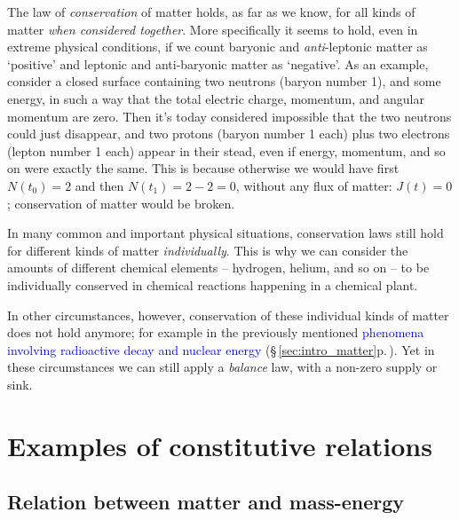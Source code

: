 \documentclass[a4paper,12pt,%
onecolumn,oneside,%
british%
]{memoir}
\renewcommand*{\|}[1][]{\nonscript\:#1\vert\nonscript\:\mathopen{}}
\newcommand*{\sect}{\S}%
\renewcommand*{\autoref}[3][\sect\,\ref]{\textcolor{blue}{#3} {\color{blue}\scriptsize(\faIcon[regular]{eye}\;#1{#2}\;p.\,\pageref{#2})}}
\newcommand*{\masse}{mass-energy}
\newcommand*{\yti}{t_{0}}
\newcommand*{\ytf}{t_{1}}
\newcommand*{\yN}{N}
\newcommand*{\yJ}{J}
\begin{document}
The law of \emph{conservation} of matter holds, as far as we know, for all kinds of matter \emph{when considered together}.
More specifically it seems to hold, even in extreme physical conditions, if we count baryonic and \emph{anti}-leptonic matter as \enquote*{positive} and leptonic and anti-baryonic matter as \enquote*{negative}. As an example, consider a closed surface containing two neutrons (baryon number \num{+1}), and some energy, in such a way that the total electric charge, momentum, and angular momentum are zero. Then it's today considered impossible that the two neutrons could just disappear, and two protons (baryon number \num{+1} each) plus two electrons (lepton number \num{+1} each) appear in their stead, even if energy, momentum, and so on were exactly the same. This is because otherwise we would have first $\yN(\yti) = \num{+2}$ and then $\yN(\ytf) = \num{+2}-\num{2}=0$, without any flux of matter: $\yJ(t)=0$; conservation of matter would be broken.
%
%

\medskip

In many common and important physical situations, conservation laws still hold for different kinds of matter \emph{individually}. This is why we can consider the amounts of different chemical elements -- hydrogen, helium, and so on -- to be individually conserved in chemical reactions happening in a chemical plant.

In other circumstances, however, conservation of these individual kinds of matter does not hold anymore; for example in the previously mentioned \autoref{sec:intro_matter}{phenomena involving radioactive decay and nuclear energy}. Yet in these circumstances we can still apply a \emph{balance} law, with a non-zero supply or sink.

\section{Examples of constitutive relations}
\label{sec:matter_constitutive}

\subsection{Relation between matter and \masse}
\label{sec:const_matter_mass}
\end{document}
